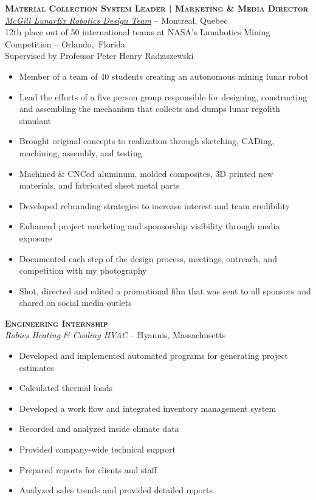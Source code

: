 \documentclass[12pt, letterpaper]{article}
\newcommand{\years}[1]{\marginnote{\footnotesize #1}} %
\begin{document}
	\begin{samepage}
		\years{8/2012 - 8/2013} \textbf{\scshape Material Collection System Leader | Marketing \& Media Director}\\
		\href{http://www.lunarex.mcgill.ca}{\textit{McGill LunarEx Robotics Design Team}} -- Montreal, Quebec\\
		{\small 12th place out of 50 international teams at NASA's Lunabotics Mining Competition -- Orlando,~Florida\\
		Supervised by Professor Peter Henry Radziszewski}
		\begin{itemize}
			\item Member of a team of 40 students creating an autonomous mining lunar robot 
			\item Lead the efforts of a five person group responsible for designing, constructing and assembling the mechanism that collects and dumps lunar regolith simulant
			\item Brought original concepts to realization through sketching, CADing, machining, assembly, and testing
			\item Machined \& CNCed aluminum, molded composites, 3D printed new materials, and fabricated sheet metal parts
			\item Developed rebranding strategies to increase interest and team credibility
			\item Enhanced project marketing and sponsorship visibility through media exposure
			\item Documented each step of the design process,  meetings, outreach, and competition with my photography
			\item Shot, directed and edited a promotional film that was sent to all sponsors and shared on social media outlets
		\end{itemize}
	\end {samepage}
	\vspace{.1in}

\clearpage

	\begin{samepage}
		\years{Summer 2012 \& Summer~2013} \textbf{\scshape Engineering Internship}\\
		\textit{Robies Heating \& Cooling HVAC} -- Hyannis, Massachusetts
		\begin{itemize}
			\item Developed and implemented automated programs for generating project estimates
			\item Calculated thermal loads
			\item Developed a work flow and integrated inventory management system
			\item Recorded and analyzed inside climate data
			\item Provided company-wide technical support
			\item Prepared reports for clients and staff
			\item Analyzed sales trends and provided detailed reports 
		\end{itemize}
	\end{samepage}
	\vspace{.1in}
\end{document}
